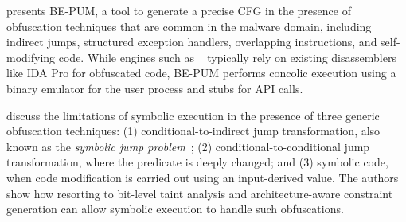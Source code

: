 \cite{HOT-FPS15} presents BE-PUM, a tool to generate a precise CFG in the presence of obfuscation techniques that are common in the malware domain, including indirect jumps, structured exception handlers, overlapping instructions, and self-modifying code. While engines such as ~\cite{BITBLAZE-ICISS08} typically rely on existing disassemblers like IDA Pro for obfuscated code, BE-PUM performs concolic execution using a binary emulator for the user process and stubs for API calls.

\cite{YD-CCS15} discuss the limitations of symbolic execution in the presence of three generic obfuscation techniques: (1) conditional-to-indirect jump transformation, also known as the {\em symbolic jump problem}~\cite{SAB-SP10}; (2) conditional-to-conditional jump transformation, where the predicate is deeply changed; and (3) symbolic code, when code modification is carried out using an input-derived value. The authors show how resorting to bit-level taint analysis and architecture-aware constraint generation can allow symbolic execution to handle such obfuscations. 

